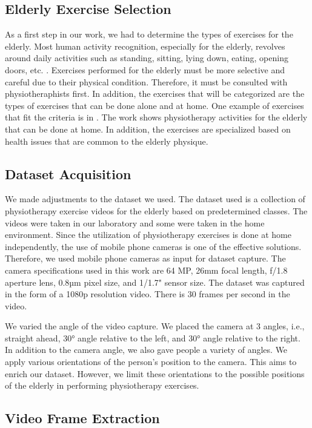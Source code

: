 \subsection{Elderly Exercise Selection}
\label{subsec3:elderly_exercise_selection}
As a first step in our work, we had to determine the types of exercises for the elderly. Most human activity recognition, especially for the elderly, revolves around daily activities such as standing, sitting, lying down, eating, opening doors, etc. \cite{elderly2, elderly1}. Exercises performed for the elderly must be more selective and careful due to their physical condition. Therefore, it must be consulted with physiotheraphists first. In addition, the exercises that will be categorized are the types of exercises that can be done alone and at home. One example of exercises that fit the criteria is in \cite{dataset1}. The work shows physiotherapy activities for the elderly that can be done at home. In addition, the exercises are specialized based on health issues that are common to the elderly physique.

\subsection{Dataset Acquisition}
\label{subsec3:dataset_acquisition}
We made adjustments to the dataset we used. The dataset used is a collection of physiotherapy exercise videos for the elderly based on predetermined classes. The videos were taken in our laboratory and some were taken in the home environment. Since the utilization of physiotherapy exercises is done at home independently, the use of mobile phone cameras is one of the effective solutions. Therefore, we used mobile phone cameras as input for dataset capture. The camera specifications used in this work are 64 MP, 26mm focal length, f/1.8 aperture lens, 0.8µm pixel size, and 1/1.7" sensor size. The dataset was captured in the form of a 1080p resolution video. There is 30 frames per second in the video.

We varied the angle of the video capture. We placed the camera at 3 angles, i.e., straight ahead, \ang{30} angle relative to the left, and \ang{30} angle relative to the right. In addition to the camera angle, we also gave people a variety of angles. We apply various orientations of the person's position to the camera. This aims to enrich our dataset. However, we limit these orientations to the possible positions of the elderly in performing physiotherapy exercises.

\subsection{Video Frame Extraction}
\label{subsec3:VideoExtraction}

